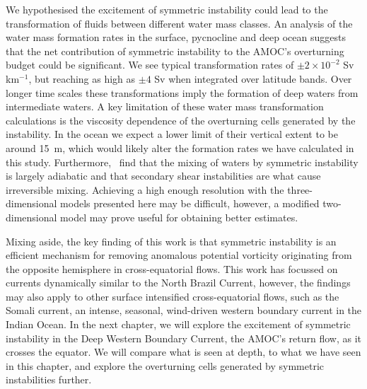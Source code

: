 We hypothesised the excitement of symmetric instability could lead to the transformation of fluids between different water mass classes. An analysis of the water mass formation rates in the surface, pycnocline and deep ocean suggests that the net contribution of symmetric instability to the AMOC's overturning budget could be significant. We see typical transformation rates of $\pm 2 \times 10^{-2}$ Sv\,km$^{-1}$, but reaching as high as $\pm 4$ Sv when integrated over latitude bands. Over longer time scales these transformations imply the formation of deep waters from intermediate waters. A key limitation of these water mass transformation calculations is the viscosity dependence of the overturning cells generated by the instability. In the ocean we expect a lower limit of their vertical extent to be around 15~m, which would likely alter the formation rates we have calculated in this study. Furthermore,~\citet{Yankovsky2019} find that the mixing of waters by symmetric instability is largely adiabatic and that secondary shear instabilities are what cause irreversible mixing. Achieving a high enough resolution with the three-dimensional models presented here may be difficult, however, a modified two-dimensional model may prove useful for obtaining better estimates.

Mixing aside, the key finding of this work is that symmetric instability is an efficient mechanism for removing anomalous potential vorticity originating from the opposite hemisphere in cross-equatorial flows. This work has focussed on currents dynamically similar to the North Brazil Current, however, the findings may also apply to other surface intensified cross-equatorial flows, such as the Somali current, an intense, seasonal, wind-driven western boundary current in the Indian Ocean. In the next chapter, we will explore the excitement of symmetric instability in the Deep Western Boundary Current, the AMOC's return flow, as it crosses the equator. We will compare what is seen at depth, to what we have seen in this chapter, and explore the overturning cells generated by symmetric instabilities further.